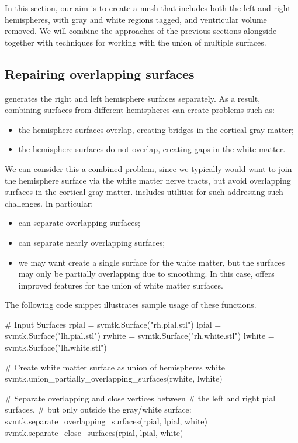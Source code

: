 In this section, our aim is to create a mesh that includes both the
left and right hemispheres, with gray and white regions tagged, and
ventricular volume removed. We will combine the approaches of the
previous sections alongside together with \svmtk{} techniques for
working with the union of multiple surfaces. 

\subsection{Repairing overlapping surfaces}

\freesurfer{} generates the right and left hemisphere surfaces
separately. As a result, combining surfaces from different hemispheres
can create problems such as:
\begin{itemize}
\item the hemisphere surfaces overlap, creating bridges in the cortical gray matter;
\item the hemisphere surfaces do not overlap, creating gaps in the white matter. 
\end{itemize} 
We can consider this a combined problem, since we typically would want
to join the hemisphere surface via the white matter nerve tracts, but
avoid overlapping surfaces in the cortical gray matter. \svmtk{}
includes utilities for such addressing such challenges. In particular:
\begin{itemize}
\item
   can separate
  overlapping surfaces;
\item
   can separate nearly
  overlapping surfaces;
\item 
  we may want create a single surface for the white matter, but the
  surfaces may only be partially overlapping due to smoothing. In this
  case,  offers
  improved features for the union of white matter surfaces.
\end{itemize}
The following code snippet illustrates sample usage of these functions.
\begin{python}
# Input Surfaces
rpial = svmtk.Surface("rh.pial.stl")
lpial = svmtk.Surface("lh.pial.stl")
rwhite = svmtk.Surface("rh.white.stl")
lwhite = svmtk.Surface("lh.white.stl")

# Create white matter surface as union of hemispheres
white = svmtk.union_partially_overlapping_surfaces(rwhite,
                                                   lwhite)

# Separate overlapping and close vertices between
# the left and right pial surfaces,
# but only outside the gray/white surface:
svmtk.separate_overlapping_surfaces(rpial, lpial, white)
svmtk.separate_close_surfaces(rpial, lpial, white) 
\end{python} 

